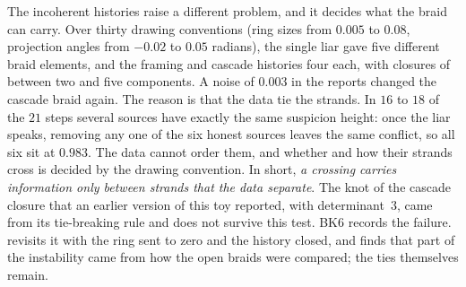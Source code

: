 \documentclass[11pt]{article}
\theoremstyle{definition}\newtheorem{definition}[theorem]{Definition}\newtheorem{remark}[theorem]{Remark}\newtheorem{example}[theorem]{Example}\newtheorem{problem}[theorem]{Open problem}\crefname{problem}{Problem}{Problems}
\begin{document}
The incoherent histories raise a different problem, and it decides what the braid can carry. Over thirty drawing conventions (ring sizes from $0.005$ to $0.08$, projection angles from $-0.02$ to $0.05$ radians), the single liar gave five different braid elements, and the framing and cascade histories four each, with closures of between two and five components. A noise of $0.003$ in the reports changed the cascade braid again. The reason is that the data tie the strands. In $16$ to $18$ of the $21$ steps several sources have exactly the same suspicion height: once the liar speaks, removing any one of the six honest sources leaves the same conflict, so all six sit at $0.983$. The data cannot order them, and whether and how their strands cross is decided by the drawing convention. In short, \emph{a crossing carries information only between strands that the data separate}. The knot of the cascade closure that an earlier version of this toy reported, with determinant~$3$, came from its tie-breaking rule and does not survive this test. BK6 records the failure.  revisits it with the ring sent to zero and the history closed, and finds that part of the instability came from how the open braids were compared; the ties themselves remain.
\end{document}
